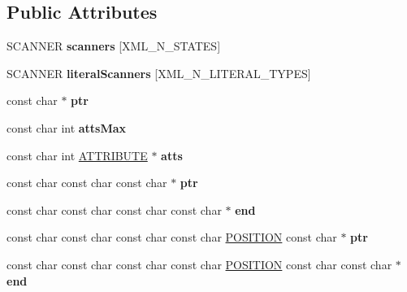 \subsection*{Public Attributes}
\begin{DoxyCompactItemize}
\item 
\mbox{\label{structencoding_af15c935d0343018b21e64a166532990e}} 
S\+C\+A\+N\+N\+ER {\bfseries scanners} \mbox{[}X\+M\+L\+\_\+\+N\+\_\+\+S\+T\+A\+T\+ES\mbox{]}
\item 
\mbox{\label{structencoding_a6ad3e1bba280862459c4762dbb10f9e0}} 
S\+C\+A\+N\+N\+ER {\bfseries literal\+Scanners} \mbox{[}X\+M\+L\+\_\+\+N\+\_\+\+L\+I\+T\+E\+R\+A\+L\+\_\+\+T\+Y\+P\+ES\mbox{]}
\item 
\mbox{\label{structencoding_ad338493153641b08ca2220ba0518bdb3}} 
const char $\ast$ {\bfseries ptr}
\item 
\mbox{\label{structencoding_a7b42e4a6bc0c0969004a6644d01784f2}} 
const char int {\bfseries atts\+Max}
\item 
\mbox{\label{structencoding_a6f0f8a65c19c1b03bfe8b298bdb419ec}} 
const char int \mbox{\hyperlink{struct_a_t_t_r_i_b_u_t_e}{A\+T\+T\+R\+I\+B\+U\+TE}} $\ast$ {\bfseries atts}
\item 
\mbox{\label{structencoding_aa4291770220296dccdae2caa59d3d10f}} 
const char const char const char $\ast$ {\bfseries ptr}
\item 
\mbox{\label{structencoding_ac4aa42001aee7a5583395c922a0d50f5}} 
const char const char const char const char $\ast$ {\bfseries end}
\item 
\mbox{\label{structencoding_ab8e153eed61327bf8fa793f53ee59e0f}} 
const char const char const char const char \mbox{\hyperlink{structposition}{P\+O\+S\+I\+T\+I\+ON}} const char $\ast$ {\bfseries ptr}
\item 
\mbox{\label{structencoding_a049c4d9fc04216e6368851a75c7dd414}} 
const char const char const char const char \mbox{\hyperlink{structposition}{P\+O\+S\+I\+T\+I\+ON}} const char const char $\ast$ {\bfseries end}

\end{DoxyCompactItemize}

